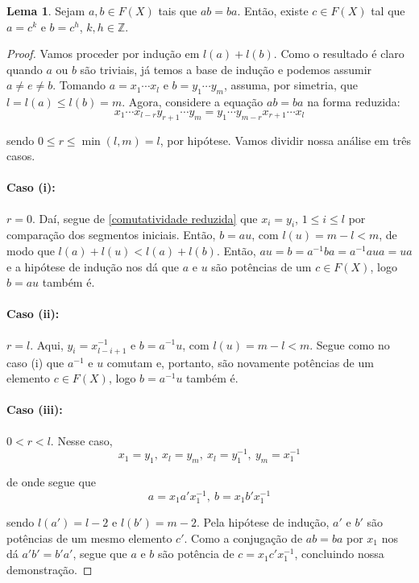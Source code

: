 \documentclass[a4paper,portuguese,11pt,twoside, leqno]{book}
\theoremstyle{definition}
\newtheorem{lemma}[theorem]{Lema}
\begin{document}
	\begin{lemma}
		\label{comutatividade em grupos livres}
		Sejam $a,b\in F(X)$ tais que $ab=ba$. Então, existe $c\in F(X)$ tal que $a = c^k$ e $b = c^h$, $k, h\in\mathbb{Z}$.
	\end{lemma}
	\begin{proof}
		Vamos proceder por indução em $l(a) + l(b)$. Como o resultado é claro quando $a$ ou $b$ são triviais, já temos a base de indução e podemos assumir $a\neq e\neq b$. Tomando $a = x_1\cdots x_l$ e $b = y_1\cdots y_m$, assuma, por simetria, que $l = l(a) \leq l(b) = m$. Agora, considere a equação $ab=ba$ na forma reduzida:
		\begin{equation}
		\label{comutatividade reduzida}
		x_1\cdots x_{l-r}y_{r+1}\cdots y_m = y_1\cdots y_{m-r}x_{r+1}\cdots x_l
		\end{equation}
		\par\vspace{0.3cm} sendo $0\leq r\leq\min(l,m) = l$, por hipótese. Vamos dividir nossa análise em três casos.
		\paragraph{Caso (i):} $r=0$. Daí, segue de \eqref{comutatividade reduzida} que $x_i=y_i$, $1\leq i\leq l$ por comparação dos segmentos iniciais. Então, $b = au$, com $l(u) = m-l<m$, de modo que $l(a) + l(u)< l(a) + l(b)$. Então, $au = b = a^{-1}ba = a^{-1}aua = ua$ e a hipótese de indução nos dá que $a$ e $u$ são potências de um $c\in F(X)$, logo $b=au$ também é.
		\paragraph{Caso (ii):} $r = l$. Aqui, $y_i = x_{l-i+1}^{-1}$ e $b = a^{-1}u$, com $l(u) = m-l<m$. Segue como no caso (i) que $a^{-1}$ e $u$ comutam e, portanto, são novamente potências de um elemento $c\in F(X)$, logo $b = a^{-1}u$ também é.
		\paragraph{Caso (iii):} $0 < r < l$. Nesse caso, 
		\begin{equation*}
		x_1 = y_1, \ x_l = y_m, \ x_l = y_1^{-1}, \ y_m = x_1^{-1}
		\end{equation*}
		\par\vspace{0.3cm} de onde segue que
		\begin{equation*}
		a = x_1a'x_1^{-1}, \ b = x_1b'x_1^{-1}
		\end{equation*}
		\par\vspace{0.3cm} sendo $l(a') = l-2$ e $l(b') = m-2$. Pela hipótese de indução, $a'$ e $b'$ são potências de um mesmo elemento $c'$. Como a conjugação de $ab=ba$ por $x_1$ nos dá $a'b' = b'a'$, segue que $a$ e $b$ são potência de $c = x_1c'x_1^{-1}$, concluindo nossa demonstração. 
	\end{proof}
\end{document}
